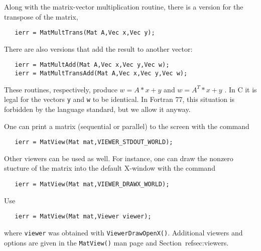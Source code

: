 Along with the matrix-vector multiplication routine, there is 
a version for the transpose of the matrix, 
\begin{verbatim}
   ierr = MatMultTrans(Mat A,Vec x,Vec y);
\end{verbatim}
There are also versions that add the result
to another vector:  
\begin{verbatim}
   ierr = MatMultAdd(Mat A,Vec x,Vec y,Vec w);
   ierr = MatMultTransAdd(Mat A,Vec x,Vec y,Vec w);
\end{verbatim}
These routines, respectively, produce $ w = A*x + y $ and $ w = A^{T}*x + y$ . 
In C it is legal for the vectors {\tt y} and {\tt w} to be identical.
In Fortran 77, this situation is forbidden by the language standard, 
but we allow it anyway.

One can print a matrix (sequential or parallel) to the screen with the 
command 
\begin{verbatim}
   ierr = MatView(Mat mat,VIEWER_STDOUT_WORLD);
\end{verbatim}
Other viewers can be used as well. For instance, one can draw the
nonzero stucture of the matrix into the default X-window with the 
command 
\begin{verbatim}
   ierr = MatView(Mat mat,VIEWER_DRAWX_WORLD);
\end{verbatim}
Use 
\begin{verbatim}
   ierr = MatView(Mat mat,Viewer viewer);
\end{verbatim}
where {\tt viewer} was obtained with {\tt ViewerDrawOpenX()}.
Additional viewers and options are given in the {\tt MatView()} man
page and Section~ref{sec:viewers}.

